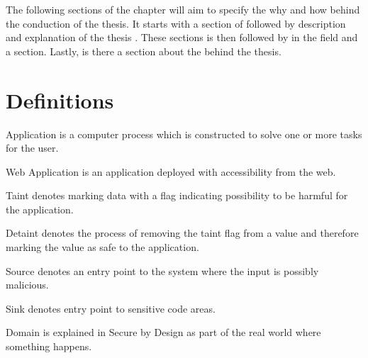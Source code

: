 The following sections of the chapter will aim to specify the why and how behind the conduction of the thesis. It starts with a section of \textit{} followed by \textit{} description and explanation of the thesis \textit{}. These sections is then followed by \textit{} in the field and a \textit{} section. Lastly, is there a section about the \textit{} behind the thesis.


\section{Definitions}
\label{Definitions}
\begin{definition}{Application} 
	is a computer process which is constructed to solve one or more tasks for the user.
	\\ 
\end{definition}

\begin{definition}{Web Application} 
	is an application deployed with accessibility from the web.
	\\ 
\end{definition}

\begin{definition}{Taint}
	denotes marking data with a flag indicating possibility to be harmful for the application.
	\\ 
\end{definition}

\begin{definition}{Detaint}
	denotes the process of removing the taint flag from a value and therefore marking the value as safe to the application.
	\\ 
\end{definition}

\begin{definition}{Source}
	denotes an entry point to the system where the input is possibly malicious.
	\\ 
\end{definition}

\begin{definition}{Sink}
	denotes entry point to sensitive code areas. 
	\\ 
\end{definition}

\begin{definition}{Domain}
	is explained in Secure by Design \parencite{sbd2018} as part of the real world where something happens.
	\\ 
\end{definition}

